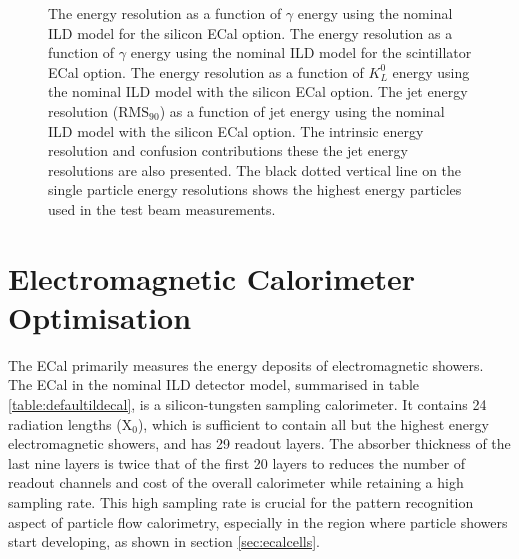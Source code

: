 \begin{figure}[h!]
\caption[\protect{} The energy resolution as a function of $\gamma$ energy using the nominal ILD model for the silicon ECal option.  \protect{} The energy resolution as a function of $\gamma$ energy using the nominal ILD model for the scintillator ECal option.  \protect{} The energy resolution as a function of $K^{0}_{L}$ energy using the nominal ILD model with the silicon ECal option.  \protect{} The jet energy resolution ($\text{RMS}_{90}$) as a function of jet energy using the nominal ILD model with the silicon ECal option.  The intrinsic energy resolution and confusion contributions these the jet energy resolutions are also presented.  The black dotted vertical line on the single particle energy resolutions shows the highest energy particles used in the test beam measurements.]{\protect{} The energy resolution as a function of $\gamma$ energy using the nominal ILD model for the silicon ECal option.  \protect{} The energy resolution as a function of $\gamma$ energy using the nominal ILD model for the scintillator ECal option.  \protect{} The energy resolution as a function of $K^{0}_{L}$ energy using the nominal ILD model with the silicon ECal option.  \protect{} The jet energy resolution ($\text{RMS}_{90}$) as a function of jet energy using the nominal ILD model with the silicon ECal option.  The intrinsic energy resolution and confusion contributions these the jet energy resolutions are also presented.  The black dotted vertical line on the single particle energy resolutions shows the highest energy particles used in the test beam measurements.}
\label{fig:nominalres}
\end{figure}


\section{Electromagnetic Calorimeter Optimisation}
\label{sec:ecal}
The ECal primarily measures the energy deposits of electromagnetic showers.  The ECal in the nominal ILD detector model, summarised in table \ref{table:defaultildecal}, is a silicon-tungsten sampling calorimeter.  It contains 24 radiation lengths ($\text{X}_{0}$), which is sufficient to contain all but the highest energy electromagnetic showers, and has 29 readout layers.  The absorber thickness of the last nine layers is twice that of the first 20 layers to reduces the number of readout channels and cost of the overall calorimeter while retaining a high sampling rate.  This high sampling rate is crucial for the pattern recognition aspect of particle flow calorimetry, especially in the region where particle showers start developing, as shown in section \ref{sec:ecalcells}.  

